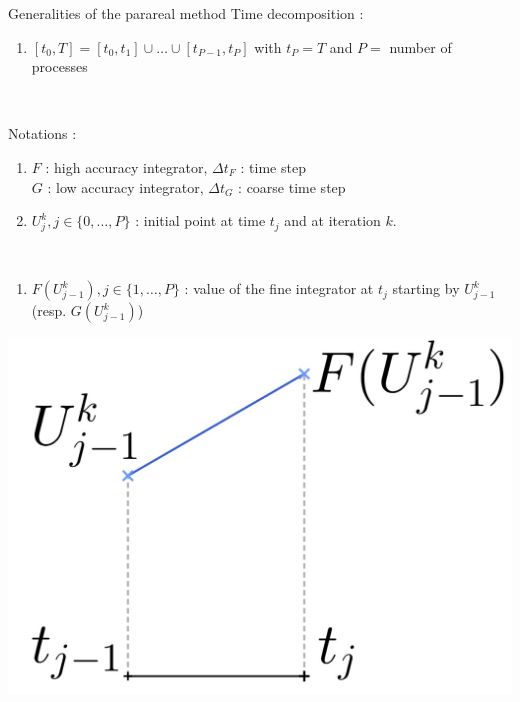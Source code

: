 \begin{frame}{Generalities of the parareal method}
	Time decomposition :
	\begin{enumerate}[\textbullet]
		\item $[t_0,T]=[t_0,t_1]\cup\dots\cup[t_{P-1},t_P]$ with $t_P=T$ and $P=$ number of processes
	\end{enumerate}

	\; \\

	\begin{minipage}{\linewidth}
		Notations :
		\begin{enumerate}[\textbullet]
			\item $F$ : high accuracy integrator, \quad $\Delta t_F$ : time step \\
			$G$ : low accuracy integrator, \quad $\Delta t_G$ : coarse time step
			\item $U_j^k, j\in\{0,\dots,P\}$ : initial point at time $t_j$ and at iteration $k$.
		\end{enumerate}
	\end{minipage} \\
	\begin{enumerate}[\textbullet]
		\item $F(U_{j-1}^k), j\in\{1,\dots,P\}$ : value of the fine integrator at $t_j$ starting by $U_{j-1}^k$ (resp. $G(U_{j-1}^k)$)
	\end{enumerate}
	\begin{minipage}{\linewidth}
		\centering
		\qquad \qquad \qquad \qquad \qquad \qquad \qquad \includegraphics[width=0.35\linewidth]{images/parareal/explane_F.jpg}
	\end{minipage}
	
\end{frame}

